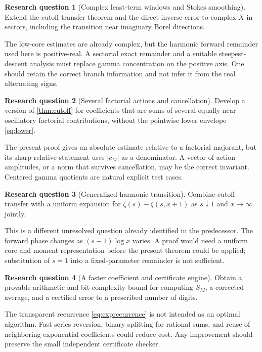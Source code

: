 \documentclass[11pt,a4paper]{article}
\theoremstyle{definition}
\newtheorem{problem}{Research question}
\numberwithin{equation}{section}
\begin{document}
\begin{problem}[Complex least-term windows and Stokes smoothing]
Extend the cutoff-transfer theorem and the direct inverse error to complex $X$ in sectors, including the transition near imaginary Borel directions.
\end{problem}
The low-core estimates are already complex, but the harmonic forward remainder used here is positive-real. A sectorial exact remainder and a suitable steepest-descent analysis must replace gamma concentration on the positive axis. One should retain the correct branch information and not infer it from the real alternating signs.

\begin{problem}[Several factorial actions and cancellation]
Develop a version of \cref{thm:cutoff} for coefficients that are sums of several equally near oscillatory factorial contributions, without the pointwise lower envelope \eqref{eq:lower}.
\end{problem}
The present proof gives an absolute estimate relative to a factorial majorant, but its sharp relative statement uses $|c_M|$ as a denominator. A vector of action amplitudes, or a norm that survives cancellation, may be the correct invariant. Centered gamma quotients are natural explicit test cases.

\begin{problem}[Generalized harmonic transition]
Combine cutoff transfer with a uniform expansion for $\zeta(s)-\zeta(s,x+1)$ as $s\downarrow1$ and $x\to\infty$ jointly.
\end{problem}
This is a different unresolved question already identified in the predecessor. The forward phase changes as $(s-1)\log x$ varies. A proof would need a uniform core and moment representation before the present theorem could be applied; substitution of $s=1$ into a fixed-parameter remainder is not sufficient.

\begin{problem}[A faster coefficient and certificate engine]
Obtain a provable arithmetic and bit-complexity bound for computing $S_M$, a corrected average, and a certified error to a prescribed number of digits.
\end{problem}
The transparent recurrence \eqref{eq:exprecurrence} is not intended as an optimal algorithm. Fast series reversion, binary splitting for rational sums, and reuse of neighboring exponential coefficients could reduce cost. Any improvement should preserve the small independent certificate checker.
\end{document}
